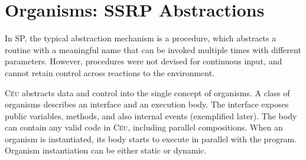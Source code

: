 \documentclass{sigplanconf}
\newcommand{\CEU}{\textsc{C\'{e}u}\xspace}
\newcommand{\1}{\;}
\newcommand{\2}{\;\;}
\newcommand{\3}{\;\;\;}
\newcommand{\5}{\;\;\;\;\;}
\begin{document}
\section{Organisms: SSRP Abstractions}
\label{sec.orgs}


%
In SP, the typical abstraction mechanism is a procedure, which abstracts a 
routine with a meaningful name that can be invoked multiple times with 
different parameters.
%
However, procedures were not devised for continuous input, and cannot retain 
control across reactions to the environment.
%

\CEU abstracts data and control into the single concept of organisms.
%
A class of organisms describes an interface and an execution body.
The interface exposes public variables, methods, and also internal events 
(exemplified later).
The body can contain any valid code in \CEU, including parallel compositions.
When an organism is instantiated, its body starts to execute in parallel with 
the program.
Organism instantiation can be either static or dynamic.
\end{document}
